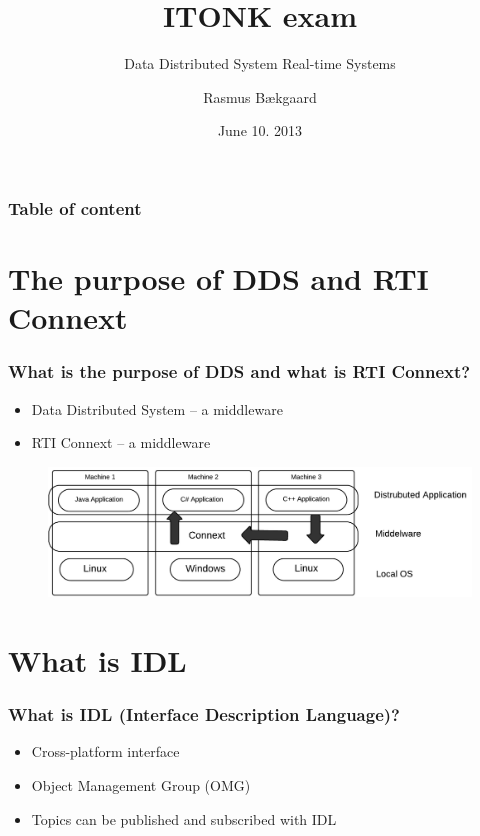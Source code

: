 \documentclass{beamer}
\title{ITONK exam}
\subtitle{Data Distributed System Real-time Systems}
\author %
{Rasmus Bækgaard\inst{1}}
\institute%
{
  \inst{1}%
  Information and Communication Technology\\
  Aarhus University, School of Engineering
}
\date{June 10. 2013}
\begin{document}
	\frame{\titlepage}
	
	\begin{frame}
		\frametitle{Table of content}
		\tableofcontents%
	\end{frame}

\section{The purpose of DDS and RTI Connext}
	\begin{frame}
		\frametitle{What is the purpose of DDS and what is RTI Connext?}
		
		\begin{itemize}
		\item Data Distributed System -- a middleware
		\item RTI Connext -- a middleware 
		\end{itemize}
		
		\begin{figure}[hbtp]
		\centering
		\includegraphics[scale=0.35]{MiddelwareImplementation}
		\end{figure}
				
	\end{frame}
		
	
\section{What is IDL}
	\begin{frame}
		\frametitle{What is IDL (Interface Description Language)?}
		
		\begin{itemize}
		\item Cross-platform interface
		\item Object Management Group (OMG)
		\item Topics can be published and subscribed with IDL
		
		\end{itemize}
		
	\end{frame}
	
\end{document}
